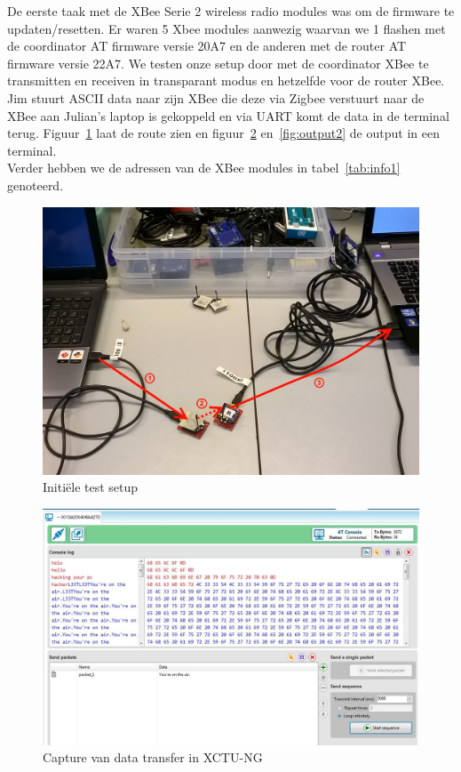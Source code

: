 \documentclass[12pt]{article}
\begin{document}
De eerste taak met de XBee Serie 2 wireless radio modules was om de firmware te updaten/resetten. Er waren 5 Xbee modules aanwezig waarvan we 1 flashen met de coordinator AT firmware versie 20A7 en de anderen met de router AT firmware versie 22A7. We testen onze setup door met de coordinator XBee te transmitten en receiven in transparant modus en hetzelfde voor de router XBee. Jim stuurt ASCII data naar zijn XBee die deze via Zigbee verstuurt naar de XBee aan Julian's laptop is gekoppeld en via UART komt de data in de terminal terug. Figuur~\ref{fig:setup1} laat de route zien en figuur~\ref{fig:output1} en~\ref{fig:output2} de output in een terminal.\\
Verder hebben we de adressen van de XBee modules in tabel~\ref{tab:info1} genoteerd. \\
\begin{center}
\begin{figure}[h]
\includegraphics[scale=.25]{test_setup_1.jpg}
\caption{Initiële test setup}
\label{fig:setup1}
\end{figure}
\end{center}
\begin{center}
\begin{figure}[h]
\includegraphics[scale=.6]{Serial_Capture.jpg}
\caption{Capture van data transfer in XCTU-NG}
\label{fig:output1}
\end{figure}
\end{center}
\end{document}
